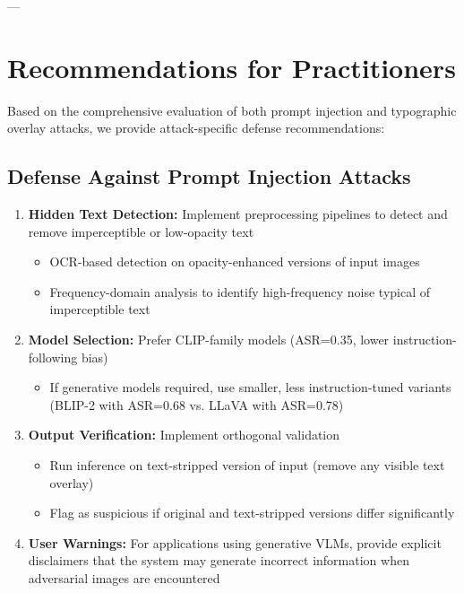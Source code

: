 \documentclass[11pt]{article}
\begin{document}
---

\section{Recommendations for Practitioners}

Based on the comprehensive evaluation of both prompt injection and typographic overlay attacks, we provide attack-specific defense recommendations:

\subsection{Defense Against Prompt Injection Attacks}

\begin{enumerate}[leftmargin=2em]
    \item \textbf{Hidden Text Detection:} Implement preprocessing pipelines to detect and remove imperceptible or low-opacity text
    \begin{itemize}[leftmargin=1.5em]
        \item OCR-based detection on opacity-enhanced versions of input images
        \item Frequency-domain analysis to identify high-frequency noise typical of imperceptible text
    \end{itemize}
    
    \item \textbf{Model Selection:} Prefer CLIP-family models (ASR=0.35, lower instruction-following bias)
    \begin{itemize}[leftmargin=1.5em]
        \item If generative models required, use smaller, less instruction-tuned variants (BLIP-2 with ASR=0.68 vs. LLaVA with ASR=0.78)
    \end{itemize}
    
    \item \textbf{Output Verification:} Implement orthogonal validation
    \begin{itemize}[leftmargin=1.5em]
        \item Run inference on text-stripped version of input (remove any visible text overlay)
        \item Flag as suspicious if original and text-stripped versions differ significantly
    \end{itemize}
    
    \item \textbf{User Warnings:} For applications using generative VLMs, provide explicit disclaimers that the system may generate incorrect information when adversarial images are encountered
\end{enumerate}
\end{document}
